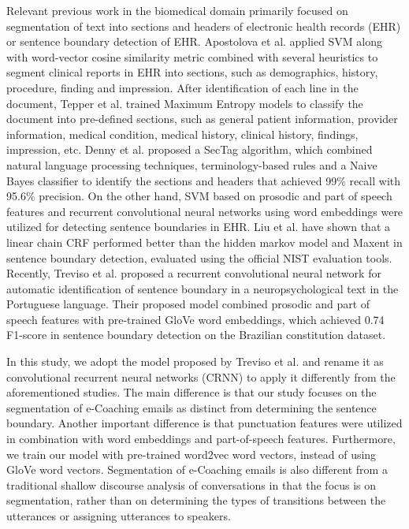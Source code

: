 \documentclass{amia}
\begin{document}
Relevant previous work in the biomedical domain primarily focused on segmentation of text into sections and headers of electronic health records (EHR)\cite{apostolova2009automatic,denny2009evaluation,tepper2012statistical,cho2002text} or sentence boundary detection of EHR.\cite{griffis2016quantitative,kreuzthaler2015detection,treviso2017sentence} Apostolova et al. applied SVM along with word-vector cosine similarity metric combined with several heuristics to segment clinical reports in EHR into sections, such as demographics, history, procedure, finding and impression.\cite{apostolova2009automatic} After identification of each line in the document, Tepper et al. trained Maximum Entropy models to classify the document into pre-defined sections, such as general patient information, provider information, medical condition, medical history, clinical history, findings, impression, etc.\cite{tepper2012statistical} Denny et al. proposed a SecTag algorithm, which combined natural language processing techniques, terminology-based rules and a Naive Bayes classifier to identify the sections and headers that achieved 99\% recall with 95.6\% precision. \cite{denny2009evaluation} On the other hand, SVM based on prosodic and part of speech features \cite{kreuzthaler2015detection} and recurrent convolutional neural networks using word embeddings \cite{griffis2016quantitative} were utilized for detecting sentence boundaries in EHR. Liu et al. have shown that a linear chain CRF performed better than the hidden markov model and Maxent in sentence boundary detection, evaluated using the official
NIST evaluation tools.\cite{liu2005using} Recently, Treviso et al. proposed a recurrent convolutional neural network for automatic identification of sentence boundary in a neuropsychological text in the Portuguese language.\cite{treviso2017sentence} Their proposed model combined prosodic and part of speech features with pre-trained GloVe word embeddings,\cite{pennington2014glove} which achieved 0.74 F1-score in sentence boundary detection on the Brazilian constitution dataset. 

In this study, we adopt the model proposed by Treviso et al. \cite{treviso2017sentence} and rename it as convolutional recurrent neural networks (CRNN) to apply it differently from the aforementioned studies. The main difference is that our study focuses on the segmentation of e-Coaching emails as distinct from determining the sentence boundary. Another important difference is that punctuation features were utilized in combination with word embeddings and part-of-speech features. Furthermore, we train our model with pre-trained word2vec word vectors,\cite{mikolov2013distributed} instead of using GloVe word vectors. Segmentation of e-Coaching emails is also different from a traditional shallow discourse analysis of conversations \cite{galley2003discourse} in that the focus is on segmentation, rather than on determining the types of transitions between the utterances or assigning utterances to speakers.
\end{document}
